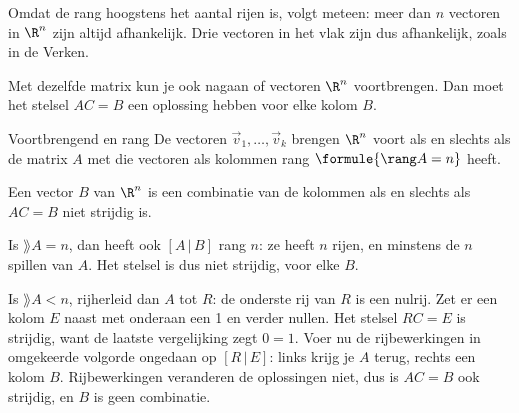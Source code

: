Omdat de rang hoogstens het aantal rijen is, volgt meteen: meer dan $n$ vectoren in $\R^n$ zijn altijd afhankelijk. Drie vectoren in het vlak zijn dus afhankelijk, zoals in de Verken.


Met dezelfde matrix kun je ook nagaan of vectoren $\R^n$ voortbrengen. Dan moet het stelsel $AC = B$ een oplossing hebben voor elke kolom $B$.

\begin{theorie}
\begin{stelling}{Voortbrengend en rang}
De vectoren $\vec v_1, \ldots, \vec v_k$ brengen $\R^n$ voort als en slechts als de matrix $A$ met die vectoren als kolommen rang $\formule{\rang A = n}$ heeft.
\end{stelling}

\begin{bewijs}
Een vector $B$ van $\R^n$ is een combinatie van de kolommen als en slechts als $AC = B$ niet strijdig is.

Is $\rang A = n$, dan heeft ook $[A \,|\, B]$ rang $n$: ze heeft $n$ rijen, en minstens de $n$ spillen van $A$. Het stelsel is dus niet strijdig, voor elke $B$.

Is $\rang A < n$, rijherleid dan $A$ tot $R$: de onderste rij van $R$ is een nulrij. Zet er een kolom $E$ naast met onderaan een 1 en verder nullen. Het stelsel $RC = E$ is strijdig, want de laatste vergelijking zegt $0 = 1$. Voer nu de rijbewerkingen in omgekeerde volgorde ongedaan op $[R \,|\, E]$: links krijg je $A$ terug, rechts een kolom $B$. Rijbewerkingen veranderen de oplossingen niet, dus is $AC = B$ ook strijdig, en $B$ is geen combinatie.
\end{bewijs}
\end{theorie}

